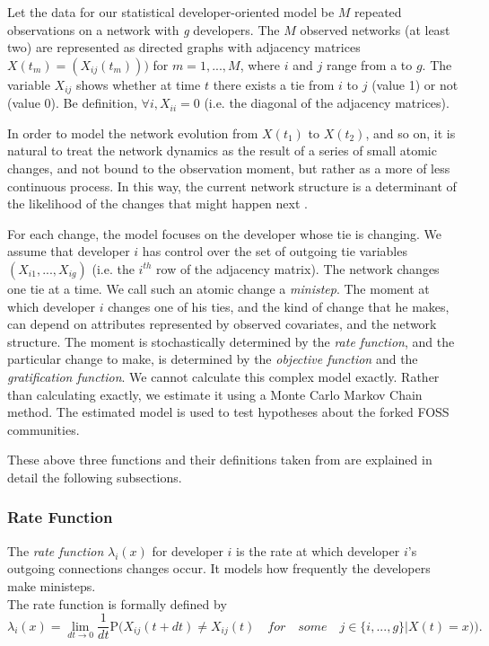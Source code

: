 \documentclass[11pt]{report}
\begin{document}
Let the data for our statistical developer-oriented model be $M$ repeated observations on a network with \textit{g} developers. The $M$ observed networks (at least two) are represented as directed graphs with adjacency matrices $X(t_m) = (X_{ij}(t_m)))$ for $m = 1,...,M$, where $i$ and $j$ range from a to $g$. The variable $X_{ij}$ shows whether at time $t$ there exists a tie from $i$ to $j$ (value 1) or not (value 0). Be definition, $\forall i, X_{ii}=0$ (i.e. the diagonal of the adjacency matrices).

In order to model the network evolution from $X(t_1)$ to $X(t_2)$, and so on, it is natural to treat the network dynamics as the result of a series of small atomic changes, and not bound to the observation moment, but rather as a more of less continuous process. In this way, the current network structure is a determinant of the likelihood of the changes that might happen next \cite{Coleman1964}. 

For each change, the model focuses on the developer whose tie is changing. We assume that developer $i$ has control over the set of outgoing  tie variables $(X_{i1}, ..., X_{ig})$ (i.e. the $i^{th}$ row of the adjacency matrix). The network changes one tie at a time. We call such an atomic change a \textit{ministep}. The moment at which developer $i$ changes one of his ties, and the kind of change that he makes, can depend on attributes represented by observed covariates, and the network structure. The moment is stochastically determined by the \textit{rate function}, and the particular change to make, is determined by the \textit{objective function} and the \textit{gratification function}. We cannot calculate this complex model exactly. Rather than calculating exactly, we estimate it using a Monte Carlo Markov Chain method. The estimated model is used to test hypotheses about the forked FOSS communities. 

These above three functions and their definitions taken from \cite{Snijders2004} are explained in detail the following subsections.

\subsubsection{Rate Function}

The \textit{rate function} $\lambda_i(x)$ for developer $i$ is the rate at which developer $i$'s outgoing connections changes occur. It models how frequently the developers make ministeps.\\
The rate function is formally defined \cite{Snijders2004} by
\begin{equation}
\lambda_i(x) = \lim_{dt \to 0} \frac{1}{dt} \mathrm {P} \big({X_{ij}(t + dt) \neq X_{ij}(t) \quad for \quad some \quad j \in \{i, ..., g\} | X(t) = x)}\big).
\end{equation}
\end{document}
